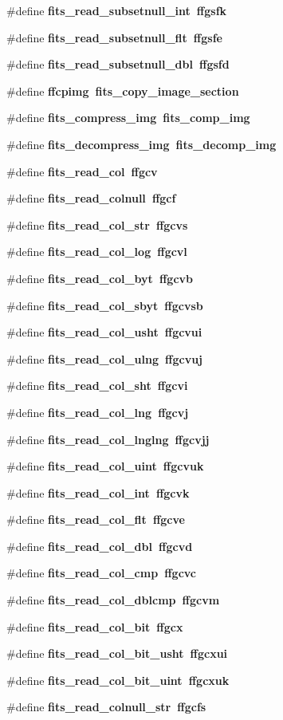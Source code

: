 \begin{CompactItemize}
\item 
\#define \bf{fits\_\-read\_\-subsetnull\_\-int}~ffgsfk
\item 
\#define \bf{fits\_\-read\_\-subsetnull\_\-flt}~ffgsfe
\item 
\#define \bf{fits\_\-read\_\-subsetnull\_\-dbl}~ffgsfd
\item 
\#define \bf{ffcpimg}~fits\_\-copy\_\-image\_\-section
\item 
\#define \bf{fits\_\-compress\_\-img}~fits\_\-comp\_\-img
\item 
\#define \bf{fits\_\-decompress\_\-img}~fits\_\-decomp\_\-img
\item 
\#define \bf{fits\_\-read\_\-col}~ffgcv
\item 
\#define \bf{fits\_\-read\_\-colnull}~ffgcf
\item 
\#define \bf{fits\_\-read\_\-col\_\-str}~ffgcvs
\item 
\#define \bf{fits\_\-read\_\-col\_\-log}~ffgcvl
\item 
\#define \bf{fits\_\-read\_\-col\_\-byt}~ffgcvb
\item 
\#define \bf{fits\_\-read\_\-col\_\-sbyt}~ffgcvsb
\item 
\#define \bf{fits\_\-read\_\-col\_\-usht}~ffgcvui
\item 
\#define \bf{fits\_\-read\_\-col\_\-ulng}~ffgcvuj
\item 
\#define \bf{fits\_\-read\_\-col\_\-sht}~ffgcvi
\item 
\#define \bf{fits\_\-read\_\-col\_\-lng}~ffgcvj
\item 
\#define \bf{fits\_\-read\_\-col\_\-lnglng}~ffgcvjj
\item 
\#define \bf{fits\_\-read\_\-col\_\-uint}~ffgcvuk
\item 
\#define \bf{fits\_\-read\_\-col\_\-int}~ffgcvk
\item 
\#define \bf{fits\_\-read\_\-col\_\-flt}~ffgcve
\item 
\#define \bf{fits\_\-read\_\-col\_\-dbl}~ffgcvd
\item 
\#define \bf{fits\_\-read\_\-col\_\-cmp}~ffgcvc
\item 
\#define \bf{fits\_\-read\_\-col\_\-dblcmp}~ffgcvm
\item 
\#define \bf{fits\_\-read\_\-col\_\-bit}~ffgcx
\item 
\#define \bf{fits\_\-read\_\-col\_\-bit\_\-usht}~ffgcxui
\item 
\#define \bf{fits\_\-read\_\-col\_\-bit\_\-uint}~ffgcxuk
\item 
\#define \bf{fits\_\-read\_\-colnull\_\-str}~ffgcfs

\end{CompactItemize}
